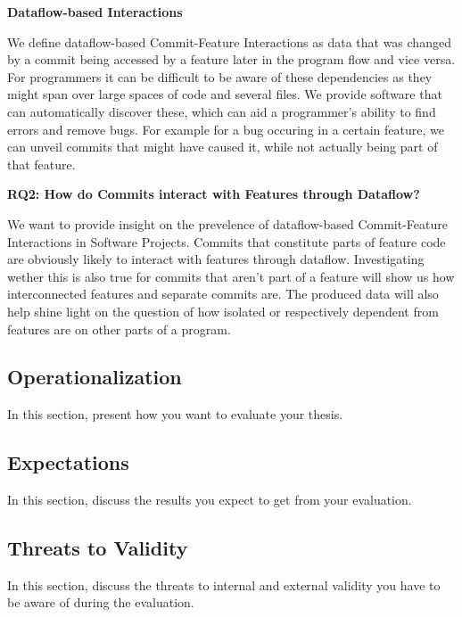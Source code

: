 \textbf{Dataflow-based Interactions} 

We define dataflow-based Commit-Feature Interactions as data that was changed by a commit being accessed by a feature later in the program flow and vice versa.
For programmers it can be difficult to be aware of these dependencies as they might span over large spaces of code and several files.
We provide software that can automatically discover these, which can aid a programmer's ability to find errors and remove bugs.
For example for a bug occuring in a certain feature, we can unveil commits that might have caused it, while not actually being part of that feature.

\textbf{RQ2: How do Commits interact with Features through Dataflow?}

We want to provide insight on the prevelence of dataflow-based Commit-Feature Interactions in Software Projects.
Commits that constitute parts of feature code are obviously likely to interact with features through dataflow.
Investigating wether this is also true for commits that aren't part of a feature will show us how interconnected features and separate commits are.
The produced data will also help shine light on the question of how isolated or respectively dependent from features are on other parts of a program.

\subsection*{Operationalization}\label{sec:operationalization}

In this section, present how you want to evaluate your thesis.

\subsection*{Expectations}\label{sec:expectations}

In this section, discuss the results you expect to get from your evaluation.

\subsection*{Threats to Validity}\label{sec:threats}

In this section, discuss the threats to internal and external validity you have to be aware of during the evaluation.
